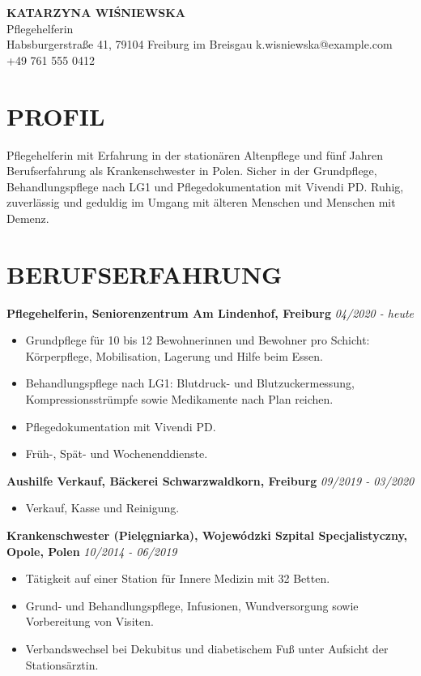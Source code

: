 \documentclass[11pt,a4paper]{article}
\begin{document}
\begin{center}
{\Huge\bfseries\color{primarycolor} KATARZYNA WIŚNIEWSKA}\\[0.3em]
{\large\color{accentcolor} Pflegehelferin}\\[0.4em]
Habsburgerstraße 41, 79104 Freiburg im Breisgau \textbar{} k.wisniewska@example.com \textbar{} +49 761 555 0412
\end{center}

\section*{PROFIL}
Pflegehelferin mit Erfahrung in der stationären Altenpflege und fünf Jahren Berufserfahrung als Krankenschwester in Polen. Sicher in der Grundpflege, Behandlungspflege nach LG1 und Pflegedokumentation mit Vivendi PD. Ruhig, zuverlässig und geduldig im Umgang mit älteren Menschen und Menschen mit Demenz.

\section*{BERUFSERFAHRUNG}
\textbf{Pflegehelferin, Seniorenzentrum Am Lindenhof, Freiburg} \hfill \textit{04/2020 - heute}
\begin{itemize}
\item Grundpflege für 10 bis 12 Bewohnerinnen und Bewohner pro Schicht: Körperpflege, Mobilisation, Lagerung und Hilfe beim Essen.
\item Behandlungspflege nach LG1: Blutdruck- und Blutzuckermessung, Kompressionsstrümpfe sowie Medikamente nach Plan reichen.
\item Pflegedokumentation mit Vivendi PD.
\item Früh-, Spät- und Wochenenddienste.
\end{itemize}

\textbf{Aushilfe Verkauf, Bäckerei Schwarzwaldkorn, Freiburg} \hfill \textit{09/2019 - 03/2020}
\begin{itemize}
\item Verkauf, Kasse und Reinigung.
\end{itemize}

\textbf{Krankenschwester (Pielęgniarka), Wojewódzki Szpital Specjalistyczny, Opole, Polen} \hfill \textit{10/2014 - 06/2019}
\begin{itemize}
\item Tätigkeit auf einer Station für Innere Medizin mit 32 Betten.
\item Grund- und Behandlungspflege, Infusionen, Wundversorgung sowie Vorbereitung von Visiten.
\item Verbandswechsel bei Dekubitus und diabetischem Fuß unter Aufsicht der Stationsärztin.
\end{itemize}
\end{document}
